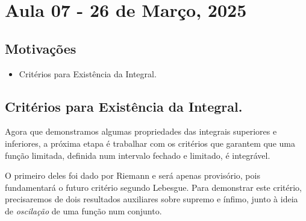 \documentclass[../analysisII_notes.tex]{subfiles}
\begin{document}
\section{Aula 07 - 26 de Março, 2025}
\subsection{Motivações}
\begin{itemize}
	\item Critérios para Existência da Integral.
\end{itemize}
\subsection{Critérios para Existência da Integral.}
Agora que demonstramos algumas propriedades das integrais superiores e inferiores, a próxima etapa é trabalhar com os critérios que garantem que uma função limitada, definida num intervalo fechado e limitado, é integrável.

O primeiro deles foi dado por Riemann e será apenas provisório, pois fundamentará o futuro critério segundo Lebesgue. Para demonstrar este critério, precisaremos de dois resultados auxiliares sobre supremo e ínfimo, junto à ideia de \textit{oscilação} de uma função num conjunto.
\end{document}
